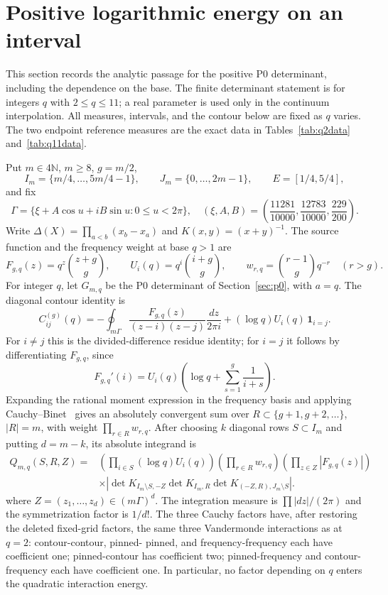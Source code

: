 \section{Positive logarithmic energy on an interval}\label{sec:p0-analytic}

This section records the analytic passage for the positive P0 determinant,
including the dependence on the base.  The finite determinant statement is
for integers $q$ with $2\le q\le11$; a real parameter is used only in the
continuum interpolation.  All measures, intervals, and the contour below are
fixed as $q$ varies.  The two endpoint reference measures are the exact data
in Tables~\ref{tab:q2data} and~\ref{tab:q11data}.

Put $m\in4\mathbb N$, $m\ge8$, $g=m/2$,
\[
 I_m=\{m/4,\ldots,5m/4-1\},\qquad
 J_m=\{0,\ldots,2m-1\},\qquad E=[1/4,5/4],
\]
and fix
\[
 \Gamma=\{\xi+A\cos u+iB\sin u:0\le u<2\pi\},\quad
 (\xi,A,B)=\left(\frac{11281}{10000},\frac{12783}{10000},
                                      \frac{229}{200}\right).
\]
Write $\Delta(X)=\prod_{a<b}(x_b-x_a)$ and $K(x,y)=(x+y)^{-1}$.
The source function and the frequency weight at base $q>1$ are
\[
 F_{g,q}(z)=q^z\binom{z+g}{g},\qquad
 U_i(q)=q^i\binom{i+g}{g},\qquad
 w_{r,q}=\binom{r-1}{g}q^{-r}\quad(r>g).
\]
For integer $q$, let $G_{m,q}$ be the P0 determinant of
Section~\ref{sec:p0}, with $a=q$.  The diagonal contour identity is
\begin{equation}\label{eq:p0-contour-q}
 C^{(g)}_{ij}(q)=-\oint_{m\Gamma}
       \frac{F_{g,q}(z)}{(z-i)(z-j)}\frac{dz}{2\pi i}
             +(\log q)U_i(q)\,\mathbf1_{i=j}.
\end{equation}
For $i\ne j$ this is the divided-difference residue identity; for $i=j$ it
follows by differentiating $F_{g,q}$, since
\[
 F_{g,q}'(i)=U_i(q)\left(\log q+\sum_{s=1}^g\frac1{i+s}\right).
\]
Expanding the rational moment expression in the frequency basis and applying
Cauchy--Binet~\cite{Gantmacher} gives an absolutely convergent sum over
$R\subset\{g+1,g+2,\ldots\}$, $|R|=m$, with weight
$\prod_{r\in R}w_{r,q}$.  After choosing $k$ diagonal rows $S\subset I_m$
and putting $d=m-k$, its absolute integrand is
\begin{equation}\label{eq:p0-q-integrand}
 \begin{aligned}
 Q_{m,q}(S,R,Z)={}&\left(\prod_{i\in S}(\log q)U_i(q)\right)
   \left(\prod_{r\in R}w_{r,q}\right)
   \left(\prod_{z\in Z}|F_{g,q}(z)|\right)\\
 &\times\left|\det K_{I_m\setminus S,-Z}\det K_{I_m,R}
                \det K_{(-Z,R),J_m\setminus S}\right|.
 \end{aligned}
\end{equation}
where $Z=(z_1,\ldots,z_d)\in(m\Gamma)^d$.  The integration measure is
$\prod |dz|/(2\pi)$ and the symmetrization factor is $1/d!$.  The three
Cauchy factors have, after restoring the deleted fixed-grid factors, the
same three Vandermonde interactions as at $q=2$: contour-contour, pinned-
pinned, and frequency-frequency each have coefficient one; pinned-contour
has coefficient two; pinned-frequency and contour-frequency each have
 coefficient one.  In particular, no factor depending on $q$ enters the
 quadratic interaction energy.


